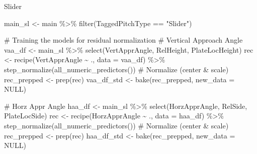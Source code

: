 \documentclass[
  letterpaper,
  DIV=11,
  numbers=noendperiod]{scrartcl}
\newenvironment{Shaded}{\begin{snugshade}}{\end{snugshade}}
\newcommand{\AttributeTok}[1]{\textcolor[rgb]{0.40,0.45,0.13}{#1}}
\newcommand{\CommentTok}[1]{\textcolor[rgb]{0.37,0.37,0.37}{#1}}
\newcommand{\ConstantTok}[1]{\textcolor[rgb]{0.56,0.35,0.01}{#1}}
\newcommand{\FunctionTok}[1]{\textcolor[rgb]{0.28,0.35,0.67}{#1}}
\newcommand{\NormalTok}[1]{\textcolor[rgb]{0.00,0.23,0.31}{#1}}
\newcommand{\OtherTok}[1]{\textcolor[rgb]{0.00,0.23,0.31}{#1}}
\newcommand{\SpecialCharTok}[1]{\textcolor[rgb]{0.37,0.37,0.37}{#1}}
\newcommand{\StringTok}[1]{\textcolor[rgb]{0.13,0.47,0.30}{#1}}
\begin{document}
Slider

\begin{Shaded}
\begin{Highlighting}[]
\NormalTok{main\_sl }\OtherTok{\textless{}{-}}\NormalTok{ main }\SpecialCharTok{\%\textgreater{}\%} 
  \FunctionTok{filter}\NormalTok{(TaggedPitchType }\SpecialCharTok{==} \StringTok{"Slider"}\NormalTok{)}

\CommentTok{\# Training the models for residual normalization}
\CommentTok{\# Vertical Approach Angle}
\NormalTok{vaa\_df }\OtherTok{\textless{}{-}}\NormalTok{ main\_sl }\SpecialCharTok{\%\textgreater{}\%}
  \FunctionTok{select}\NormalTok{(VertApprAngle, RelHeight, PlateLocHeight)}
\NormalTok{rec }\OtherTok{\textless{}{-}} \FunctionTok{recipe}\NormalTok{(VertApprAngle }\SpecialCharTok{\textasciitilde{}}\NormalTok{ ., }\AttributeTok{data =}\NormalTok{ vaa\_df) }\SpecialCharTok{\%\textgreater{}\%}
  \FunctionTok{step\_normalize}\NormalTok{(}\FunctionTok{all\_numeric\_predictors}\NormalTok{())     }\CommentTok{\# Normalize (center \& scale)}
\NormalTok{rec\_prepped }\OtherTok{\textless{}{-}} \FunctionTok{prep}\NormalTok{(rec)}
\NormalTok{vaa\_df\_std }\OtherTok{\textless{}{-}} \FunctionTok{bake}\NormalTok{(rec\_prepped, }\AttributeTok{new\_data =} \ConstantTok{NULL}\NormalTok{)}

\CommentTok{\# Horz Appr Angle}
\NormalTok{haa\_df }\OtherTok{\textless{}{-}}\NormalTok{ main\_sl }\SpecialCharTok{\%\textgreater{}\%}
  \FunctionTok{select}\NormalTok{(HorzApprAngle, RelSide, PlateLocSide)}
\NormalTok{rec }\OtherTok{\textless{}{-}} \FunctionTok{recipe}\NormalTok{(HorzApprAngle }\SpecialCharTok{\textasciitilde{}}\NormalTok{ ., }\AttributeTok{data =}\NormalTok{ haa\_df) }\SpecialCharTok{\%\textgreater{}\%}
  \FunctionTok{step\_normalize}\NormalTok{(}\FunctionTok{all\_numeric\_predictors}\NormalTok{())     }\CommentTok{\# Normalize (center \& scale)}
\NormalTok{rec\_prepped }\OtherTok{\textless{}{-}} \FunctionTok{prep}\NormalTok{(rec)}
\NormalTok{haa\_df\_std }\OtherTok{\textless{}{-}} \FunctionTok{bake}\NormalTok{(rec\_prepped, }\AttributeTok{new\_data =} \ConstantTok{NULL}\NormalTok{)}
\end{Highlighting}
\end{Shaded}

\begin{Shaded}
\end{Shaded}
\end{document}
